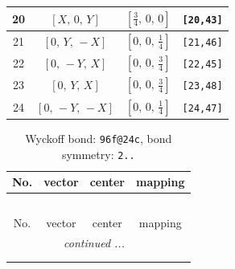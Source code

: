 \documentclass[fleqn,8pt]{jsarticle}
\begin{document}
\begin{longtable}{cccc}
20 & $\left[ X,\, 0,\, Y \right]$ & $\left[ \frac{3}{4},\, 0,\, 0 \right]$ & {\tt [20,43]} \\ \hline
21 & $\left[ 0,\, Y,\, - X \right]$ & $\left[ 0,\, 0,\, \frac{1}{4} \right]$ & {\tt [21,46]} \\ \hline
22 & $\left[ 0,\, - Y,\, X \right]$ & $\left[ 0,\, 0,\, \frac{3}{4} \right]$ & {\tt [22,45]} \\ \hline
23 & $\left[ 0,\, Y,\, X \right]$ & $\left[ 0,\, 0,\, \frac{3}{4} \right]$ & {\tt [23,48]} \\ \hline
24 & $\left[ 0,\, - Y,\, - X \right]$ & $\left[ 0,\, 0,\, \frac{1}{4} \right]$ & {\tt [24,47]} \\
\end{longtable}
\renewcommand{\arraystretch}{1.2}
\begin{longtable}{cccc}
\caption{Wyckoff bond: {\tt 96f@24c}, bond symmetry: {\tt 2..}}
 \\
 \hline \hline
No. & vector & center & mapping \\ \hline \endfirsthead

\multicolumn{3}{l}{\tablename\ \thetable{}} \\
 \hline \hline
No. & vector & center & mapping \\ \hline \endhead

 \hline \hline
\multicolumn{3}{r}{\footnotesize\it continued ...} \\ \endfoot

 \hline \hline
\multicolumn{3}{r}{} \\ \endlastfoot


\end{longtable}
\end{document}
